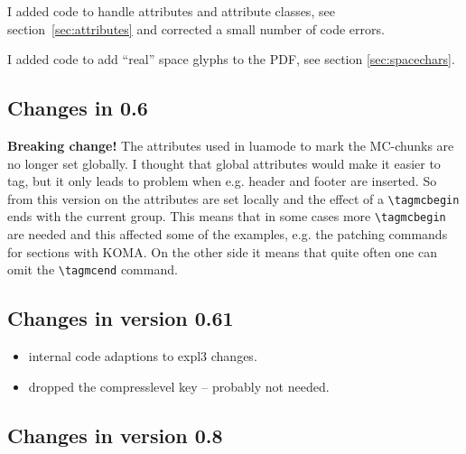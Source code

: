 \documentclass[DIV=12,parskip=half-,bibliography=totoc]{scrartcl}
\newcommand\PDF{PDF}
\begin{document}
I added code to handle attributes and attribute classes, see section~\ref{sec:attributes} and corrected a small number of code errors.

I added code to add \enquote{real} space glyphs to the \PDF{}, see section \ref{sec:spacechars}.



\subsection{Changes in 0.6}


\textbf{Breaking change!} The attributes used in luamode to mark the MC-chunks are no longer set globally. I thought that global attributes would make it easier to tag, but it only leads to problem when e.g. header and footer are inserted. So from this version on the attributes are set locally and the effect of a \verb+\tagmcbegin+ ends with the current group. This means that in some cases more \verb+\tagmcbegin+ are needed and  this affected some of the examples, e.g. the patching commands for sections with KOMA. On the other side it means that quite often one can omit the \verb+\tagmcend+ command.


\subsection{Changes in version 0.61}

\begin{itemize}
\item internal code adaptions to expl3 changes.
\item dropped the compresslevel key  -- probably not needed.
\end{itemize}


\subsection{Changes in version 0.8}
\end{document}
